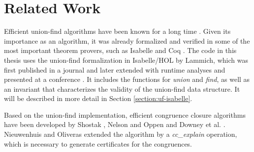 \section{Related Work}

Efficient union-find algorithms have been known for a long time \cite{unionfind-og, Tarjan}. Given its importance as an algorithm, it was already formalized and verified in some of the most important theorem provers, such as Isabelle and Coq \cite{unionfind-persistent}. The code in this thesis uses the union-find formalization in Isabelle/HOL by Lammich, which was first published in a journal \cite{unionfind-isabelle} and later extended with runtime analyses and presented at a conference \cite{unionfind-isabelle-conference}. It includes the functions for \emph{union} and \emph{find}, as well as an invariant that characterizes the validity of the union-find data structure. It will be described in more detail in Section \ref{section:uf-isabelle}.

Based on the union-find implementation, efficient congruence closure algorithms have been developed by Shostak \cite{congruenceclosure-og2}, Nelson and Oppen \cite{congruenceclosure-og} and Downey et al. \cite{congruenceclosure-og3}.
Nieuwenhuis and Oliveras \cite{Nieuwenhuis} extended the algorithm by a \emph{cc\_explain} operation, which is necessary to generate certificates for the congruences.

